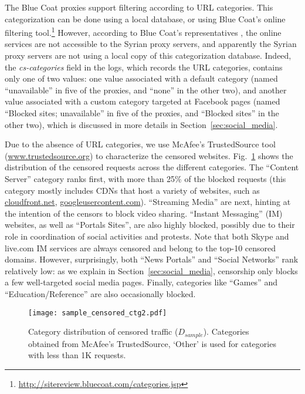 \documentclass{sig-alternate-2013}
\newcommand{\descr}[1]{\smallskip\noindent{\bf #1}}
\begin{document}
\descr{Categories.} The Blue Coat proxies support filtering according to URL categories. This categorization can be done using a local database, or using Blue Coat's online filtering tool.\footnote{\url{http://sitereview.bluecoat.com/categories.jsp}} However, according to Blue Coat's representatives \cite{valentino}, the online services are not accessible to the Syrian proxy servers, and apparently the Syrian proxy servers are not using a local copy of this categorization database.
Indeed, the \emph{cs-categories} field in the logs, which records the URL categories, contains only one of two values: one value associated with a default category (named ``unavailable'' in five of the proxies, and ``none'' in the other two), and another value associated with a custom category targeted at Facebook pages (named ``Blocked sites; unavailable'' in five of the proxies, and ``Blocked sites'' in the other two), which is discussed in more details in Section~\ref{sec:social_media}. 

Due to the absence of URL categories, we use McAfee's TrustedSource tool (\url{www.trustedsource.org}) to characterize the censored websites. Fig.~\ref{fig:ctg_dictribution_censored_sample} shows the distribution of the censored requests across the different categories. The ``Content Server'' category ranks first, with more than 25\% of the blocked requests (this category mostly includes CDNs that host a variety of websites, such as \url{cloudfront.net}, \url{googleusercontent.com}). 
``Streaming Media'' are next, hinting at the intention of the censors to block video sharing. ``Instant Messaging'' (IM) websites, as well as ``Portals Sites'', are also highly blocked, possibly due to their role in coordination of social activities and protests. Note that both Skype and live.com IM services are always censored and belong to the top-10 censored domains. However, surprisingly, both ``News Portals'' and ``Social Networks'' rank relatively low: as we explain in Section~\ref{sec:social_media}, censorship only blocks a few well-targeted social media pages. Finally, categories like ``Games'' and ``Education/Reference'' are also occasionally blocked.  


\begin{figure}[t!]
 \begin{center}
 \texttt{[image: sample\_censored\_ctg2.pdf]}
\caption{Category distribution of censored traffic ($D_{sample}$). Categories obtained from McAfee's TrustedSource, `Other' is used for categories with less than 1K requests.}
\label{fig:ctg_dictribution_censored_sample}
\end{center}
\end{figure} 
\end{document}
